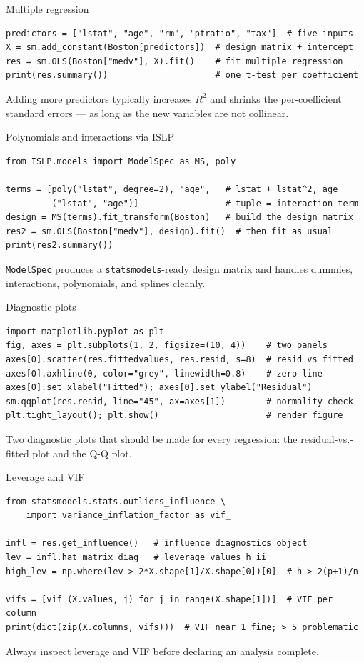 \documentclass[aspectratio=169,11pt]{beamer}
\begin{document}
\begin{frame}[fragile]{Multiple regression}
  \begin{lstlisting}
predictors = ["lstat", "age", "rm", "ptratio", "tax"]  # five inputs
X = sm.add_constant(Boston[predictors])  # design matrix + intercept
res = sm.OLS(Boston["medv"], X).fit()    # fit multiple regression
print(res.summary())                     # one t-test per coefficient
  \end{lstlisting}
  Adding more predictors typically increases $R^2$ and shrinks the
  per-coefficient standard errors --- as long as the new variables are
  not collinear.
\end{frame}

\begin{frame}[fragile]{Polynomials and interactions via ISLP}
  \begin{lstlisting}
from ISLP.models import ModelSpec as MS, poly

terms = [poly("lstat", degree=2), "age",   # lstat + lstat^2, age
         ("lstat", "age")]                 # tuple = interaction term
design = MS(terms).fit_transform(Boston)   # build the design matrix
res2 = sm.OLS(Boston["medv"], design).fit()  # then fit as usual
print(res2.summary())
  \end{lstlisting}
  \texttt{ModelSpec} produces a \texttt{statsmodels}-ready design
  matrix and handles dummies, interactions, polynomials, and splines
  cleanly.
\end{frame}

\begin{frame}[fragile]{Diagnostic plots}
  \begin{lstlisting}
import matplotlib.pyplot as plt
fig, axes = plt.subplots(1, 2, figsize=(10, 4))    # two panels
axes[0].scatter(res.fittedvalues, res.resid, s=8)  # resid vs fitted
axes[0].axhline(0, color="grey", linewidth=0.8)    # zero line
axes[0].set_xlabel("Fitted"); axes[0].set_ylabel("Residual")
sm.qqplot(res.resid, line="45", ax=axes[1])        # normality check
plt.tight_layout(); plt.show()                     # render figure
  \end{lstlisting}
  Two diagnostic plots that should be made for every regression: the
  residual-vs.-fitted plot and the Q-Q plot.
\end{frame}

\begin{frame}[fragile]{Leverage and VIF}
  \begin{lstlisting}
from statsmodels.stats.outliers_influence \
    import variance_inflation_factor as vif_

infl = res.get_influence()   # influence diagnostics object
lev = infl.hat_matrix_diag   # leverage values h_ii
high_lev = np.where(lev > 2*X.shape[1]/X.shape[0])[0]  # h > 2(p+1)/n

vifs = [vif_(X.values, j) for j in range(X.shape[1])]  # VIF per column
print(dict(zip(X.columns, vifs)))  # VIF near 1 fine; > 5 problematic
  \end{lstlisting}
  Always inspect leverage and VIF before declaring an analysis
  complete.
\end{frame}
\end{document}
